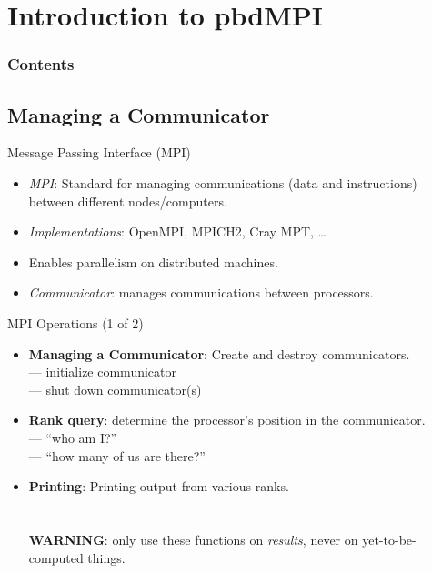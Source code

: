 \section[pbdMPI]{Introduction to pbdMPI}

\hidenum
\begin{frame}[noframenumbering]
\frametitle{Contents}
 \tableofcontents[currentsection,hideothersubsections,sectionstyle=show/hide]
\end{frame}
\shownum

\subsection{Managing a Communicator}

\begin{frame}
  \begin{block}{Message Passing Interface (MPI)}\pause
    \begin{itemize}
      \item \textit{MPI}: Standard for managing communications (data and instructions) between different nodes/computers.
      \item \textit{Implementations}:  OpenMPI, MPICH2, Cray MPT, \dots
      \item Enables parallelism on distributed machines.
      \item \textit{Communicator}: manages communications between processors.
    \end{itemize}
  \end{block}
\end{frame}


\begin{frame}
  \begin{block}{MPI Operations (1 of 2)}\pause
    \begin{itemize}
      \item \textbf{Managing a Communicator}:  Create and destroy communicators.\\
       --- initialize communicator\\
       --- shut down communicator(s)
      \\[.4cm]
      \item \textbf{Rank query}: determine the processor's position in the communicator.\\
       --- ``who am I?''\\
       --- ``how many of us are there?''\\[.4cm]
      \item \textbf{Printing}:  Printing output from various ranks.\\
      \\
      \\
      \textbf{WARNING}: only use these functions on \emph{results}, never on yet-to-be-computed things.\\
    \end{itemize}
  \end{block}
\end{frame}


